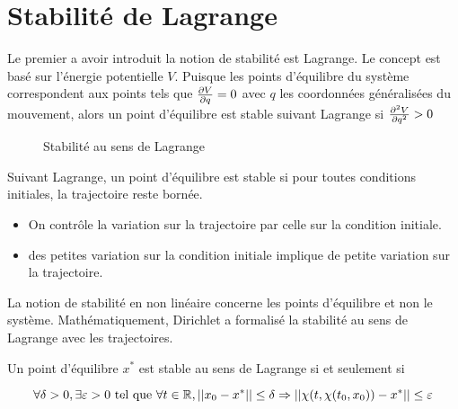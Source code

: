 \documentclass[main.tex]{subfiles} \newcommand{\D}{\mathcal{D}}
\begin{document}
\section{Stabilité de Lagrange} Le premier a avoir introduit la notion de
stabilité est Lagrange.  Le concept est basé sur l'énergie potentielle $V$.
Puisque les points d'équilibre du système correspondent aux points tels que
$\derivp[V]{q}=0$ avec $q$ les coordonnées généralisées du mouvement, alors un
point d'équilibre est stable suivant Lagrange si $\derivpp[V]{q} > 0$

\begin{figure}[H] \centering {} \caption{Stabilité au sens de Lagrange}
\end{figure}

Suivant Lagrange, un point d'équilibre est stable si pour toutes conditions
initiales, la trajectoire reste bornée.

\begin{itemize} \item On contrôle la variation sur la trajectoire par celle sur
la condition initiale.  \item des petites variation sur la condition initiale
implique de petite variation sur la trajectoire.  \end{itemize}

\begin{rem} La notion de stabilité en non linéaire concerne les points
d'équilibre et non le système. Mathématiquement, Dirichlet a formalisé la
stabilité au sens de Lagrange avec les trajectoires.  \end{rem} \newpage
\begin{defin} Un point d'équilibre $x^*$ est stable au sens de Lagrange si et
	seulement si

  \[\forall \delta > 0, \exists \varepsilon > 0 \text{ tel que } \forall t \in
\R, || x_0-x^* || \leq \delta \Rightarrow ||\chi(t,\chi(t_0,x_0))-x^* || \leq
\varepsilon\] \end{defin}
\end{document}
